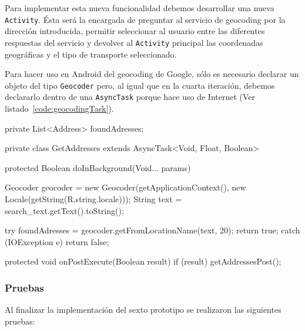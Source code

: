 Para implementar esta nueva funcionalidad debemos desarrollar una nueva \texttt{Activity}. Ésta será
la encargada de preguntar al servicio de geocoding por la dirección introducida, permitir
seleccionar al usuario entre las diferentes respuestas del servicio y devolver al \texttt{Activity}
principal las coordenadas geográficas y el tipo de transporte seleccionado.

Para hacer uso en Android del geocoding de Google, sólo es necesario declarar un objeto del tipo
\texttt{Geocoder} pero, al igual que en la cuarta iteración, debemos declararlo dentro de una
\texttt{AsyncTask} porque hace uso de Internet (Ver listado~\ref{code:geocodingTask}).

\begin{listing}[
  float=ht,
  language = java,
  caption  = {Ejemplo de implementación de \texttt{Geocoder} dentro de una \texttt{AsyncTask}},
  label    = code:geocodingTask]
private List<Address> foundAdresses;

private class GetAddresses extends AsyncTask<Void, Float, Boolean> {
  protected Boolean doInBackground(Void... params) {
    Geocoder geocoder = new Geocoder(getApplicationContext(),
        new Locale(getString(R.string.locale)));
    String text = search_text.getText().toString();

    try {
      foundAdresses = geocoder.getFromLocationName(text, 20);
      return true;
    } catch (IOException e) {
      return false;
    }
  }
  
  protected void onPostExecute(Boolean result) {
    if (result) getAddressesPost();
  }
}
\end{listing}
\subsubsection{Pruebas}

Al finalizar la implementación del sexto prototipo se realizaron las siguientes pruebas:

